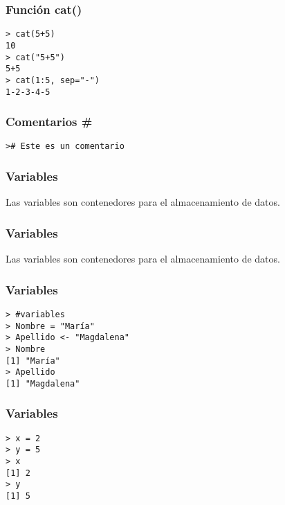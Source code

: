 \documentclass[12pt]{beamer}
\begin{document}
	\begin{frame}
		\frametitle{Función cat()}
		\texttt{> cat(5+5)}\\
		\texttt{10}\\
		\texttt{> cat("5+5")}\\
		\texttt{5+5}\\
		\texttt{> cat(1:5, sep="-")}\\
		\texttt{1-2-3-4-5}\\
	\end{frame}

	\begin{frame}
		\frametitle{Comentarios \#}
		
		\texttt{>\# Este es un comentario}
	\end{frame}

	\begin{frame}
		\frametitle{Variables}
		
		Las variables son contenedores para el almacenamiento de datos.
		
	\end{frame}

	\begin{frame}
	\frametitle{Variables}
	
	Las variables son contenedores para el almacenamiento de datos.
	
\end{frame}

	\begin{frame}
	\frametitle{Variables}
		\texttt{> \#variables \\}
		\texttt{> Nombre = "María"}\\
		\texttt{> Apellido <- "Magdalena"}\\
		\texttt{> Nombre}\\
		\texttt{[1] "María"}\\
		\texttt{> Apellido}\\
		\texttt{[1] "Magdalena"}
	\end{frame}

	\begin{frame}
		\frametitle{Variables}
		
		\texttt{> x = 2}\\
		\texttt{> y = 5}\\
		\texttt{> x}\\
		\texttt{[1] 2}\\
		\texttt{> y}\\
		\texttt{[1] 5}
		
	\end{frame}
\end{document}
